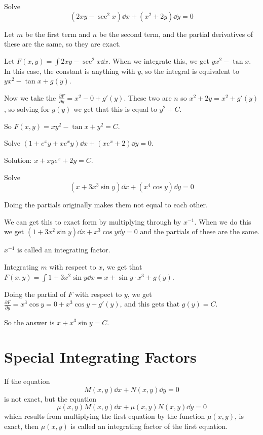 \documentclass[../diffeq.tex]{subfiles}
\begin{document}
\pagebreak
\begin{example}
    Solve 
    \[ (2xy-\sec^2 x)\dd x + (x^2+2y)\dd y = 0 \]

    Let $m$ be the first term and $n$ be the second term, and the partial derivatives of these are the same, so they are exact.

    Let $F(x,y)=\int 2xy-\sec^2 x \dd x$. When we integrate this, we get $yx^2-\tan x$. In this case, the constant is anything with $y$, so the integral is equivalent to 
    $yx^2-\tan x + g(y)$.

    Now we take the $\frac{\partial F}{\partial y} = x^2-0+g'(y)$. These two are $n$ so $x^2+2y=x^2+g'(y)$, so solving for $g(y)$ we get that this is equal to $y^2+C$.

    So $F(x,y)=xy^2-\tan x + y^2 = C$.
\end{example}

\ex Solve $(1+e^xy+xe^xy)\dd x + (xe^x+2)\dd y = 0$.

Solution: $x+xye^x+2y=C$.

\begin{example}
    Solve 
    \[ (x+3x^3\sin y)\dd x+(x^4\cos y)\dd y = 0 \]

    Doing the partials originally makes them not equal to each other.
    
    We can get this to exact form by multiplying through by $x^{-1}$. When we do this we get $(1+3x^2\sin y)\dd x+x^3\cos y \dd y = 0$ and the partials of these are the same.

    $x^{-1}$ is called an integrating factor.

    Integrating $m$ with respect to $x$, we get that $F(x,y)=\int 1+3x^2\sin y\dd x = x+\sin y\cdot x^3 + g(y)$.

    Doing the partial of $F$ with respect to $y$, we get $\frac{\partial F}{\partial y}=x^3\cos y = 0 + x^3\cos y + g'(y)$, and this gets that $g(y)=C$.

    So the answer is $x+x^3\sin y = C$.
\end{example}

\section{Special Integrating Factors}
\begin{definition}
    If the equation 
    \[ M(x,y)\dd x + N(x,y)\dd y = 0\]
    is not exact, but the equation 
    \[ \mu(x,y)M(x,y)\dd x + \mu(x,y)N(x,y)\dd y = 0 \]
    which results from multiplying the first equation by the function $\mu(x,y)$, is exact, then $\mu(x,y)$ is called an integrating factor of the first equation.
\end{definition}
\end{document}
